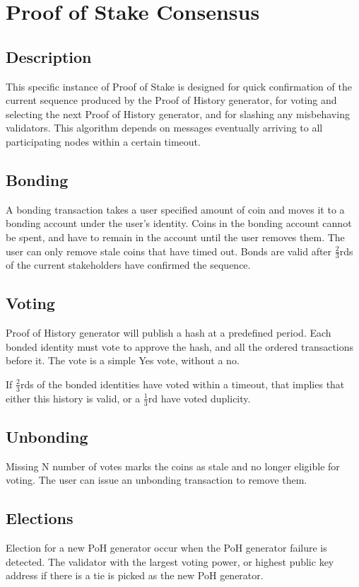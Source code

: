 \documentclass[12pt]{article}
\begin{document}
\section{Proof of Stake Consensus}\label{proof_of_stake}
\subsection{Description}
This specific instance of Proof of Stake is designed for quick confirmation of the current sequence produced by the Proof of History generator, for voting and selecting the next Proof of History generator, and for slashing any misbehaving validators.  This algorithm depends on messages eventually arriving to all participating nodes within a certain timeout.
\subsection{Bonding}
A bonding transaction takes a user specified amount of coin and moves it to a bonding account under the user’s identity.  Coins in the bonding account cannot be spent, and have to remain in the account until the user removes them.  The user can only remove stale coins that have timed out. Bonds are valid after \(\frac{2}{3}\)rds of the current stakeholders have confirmed the sequence.

\subsection{Voting}
Proof of History generator will publish a hash at a predefined period.  Each bonded identity must vote to approve the hash, and all the ordered transactions before it.  The vote is a simple Yes vote, without a no.

If \(\frac{2}{3}\)rds of the bonded identities have voted within a timeout, that implies that either this history is valid, or a \(\frac{1}{3}\)rd have voted duplicity.

\subsection{Unbonding}

Missing N number of votes marks the coins as stale and no longer eligible for voting.  The user can issue an unbonding transaction to remove them.
\subsection{Elections}\label{subsec:elections}
Election for a new PoH generator occur when the PoH generator failure is detected.  The validator with the largest voting power, or highest public key address if there is a tie is picked as the new PoH generator.
\end{document}
